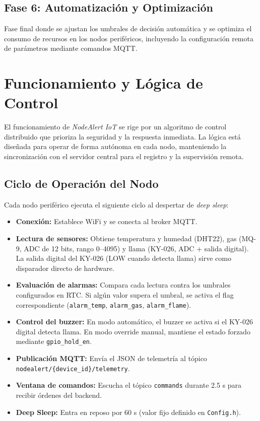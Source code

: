 \documentclass[11pt,a4paper]{article}
\begin{document}
\subsection{Fase 6: Automatización y Optimización}
Fase final donde se ajustan los umbrales de decisión automática y se optimiza el consumo de recursos en los nodos periféricos, incluyendo la configuración remota de parámetros mediante comandos MQTT.

\section{Funcionamiento y Lógica de Control}

El funcionamiento de \textit{NodeAlert IoT} se rige por un algoritmo de control distribuido que prioriza la seguridad y la respuesta inmediata. La lógica está diseñada para operar de forma autónoma en cada nodo, manteniendo la sincronización con el servidor central para el registro y la supervisión remota.

\subsection{Ciclo de Operación del Nodo}
Cada nodo periférico ejecuta el siguiente ciclo al despertar de \textit{deep sleep}:
\begin{itemize}
    \item \textbf{Conexión:} Establece WiFi y se conecta al broker MQTT.
    \item \textbf{Lectura de sensores:} Obtiene temperatura y humedad (DHT22), gas (MQ-9, ADC de 12 bits, rango 0--4095) y llama (KY-026, ADC + salida digital). La salida digital del KY-026 (LOW cuando detecta llama) sirve como disparador directo de hardware.
    \item \textbf{Evaluación de alarmas:} Compara cada lectura contra los umbrales configurados en RTC. Si algún valor supera el umbral, se activa el flag correspondiente (\texttt{alarm\_temp}, \texttt{alarm\_gas}, \texttt{alarm\_flame}).
    \item \textbf{Control del buzzer:} En modo automático, el buzzer se activa si el KY-026 digital detecta llama. En modo override manual, mantiene el estado forzado mediante \texttt{gpio\_hold\_en}.
    \item \textbf{Publicación MQTT:} Envía el JSON de telemetría al tópico \texttt{nodealert/\{device\_id\}/telemetry}.
    \item \textbf{Ventana de comandos:} Escucha el tópico \texttt{commands} durante 2.5 s para recibir órdenes del backend.
    \item \textbf{Deep Sleep:} Entra en reposo por 60 s (valor fijo definido en \texttt{Config.h}).
\end{itemize}
\end{document}
